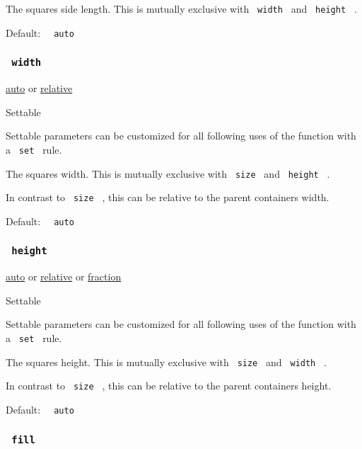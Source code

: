 The square\textquotesingle s side length. This is mutually exclusive
with \texttt{\ width\ } and \texttt{\ height\ } .

Default: \texttt{\ }{\texttt{\ auto\ }}\texttt{\ }

\subsubsection{\texorpdfstring{\texttt{\ width\ }}{ width }}\label{parameters-width}

\href{/docs/reference/foundations/auto/}{auto} {or}
\href{/docs/reference/layout/relative/}{relative}

{{ Settable }}

\label{parameters-width-settable-tooltip}
Settable parameters can be customized for all following uses of the
function with a \texttt{\ set\ } rule.

The square\textquotesingle s width. This is mutually exclusive with
\texttt{\ size\ } and \texttt{\ height\ } .

In contrast to \texttt{\ size\ } , this can be relative to the parent
container\textquotesingle s width.

Default: \texttt{\ }{\texttt{\ auto\ }}\texttt{\ }

\subsubsection{\texorpdfstring{\texttt{\ height\ }}{ height }}\label{parameters-height}

\href{/docs/reference/foundations/auto/}{auto} {or}
\href{/docs/reference/layout/relative/}{relative} {or}
\href{/docs/reference/layout/fraction/}{fraction}

{{ Settable }}

\label{parameters-height-settable-tooltip}
Settable parameters can be customized for all following uses of the
function with a \texttt{\ set\ } rule.

The square\textquotesingle s height. This is mutually exclusive with
\texttt{\ size\ } and \texttt{\ width\ } .

In contrast to \texttt{\ size\ } , this can be relative to the parent
container\textquotesingle s height.

Default: \texttt{\ }{\texttt{\ auto\ }}\texttt{\ }

\subsubsection{\texorpdfstring{\texttt{\ fill\ }}{ fill }}\label{parameters-fill}

